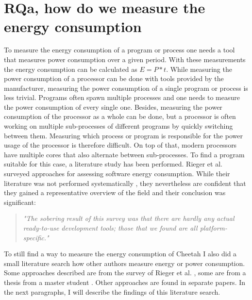 \documentclass[../thesis.tex]{subfiles}
\begin{document}
\section{RQa, how do we measure the energy consumption}
\label{section:rqa}To measure the energy consumption of a program or process one needs a tool that measures power consumption over a given period. With these measurements the energy consumption can be calculated as $E=P*t$. While measuring the power consumption of a processor can be done with tools provided by the manufacturer, measuring the power consumption of a single program or process is less trivial. Programs often spawn multiple processes and one needs to measure the power consumption of every single one.  Besides, measuring the power consumption of the processor as a whole can be done, but a processor is often working on multiple sub-processes of different programs by quickly switching between them. Measuring which process or program is responsible for the power usage of the processor is therefore difficult. On top of that, modern processors have multiple cores that also alternate between sub-processes. To find a program suitable for this case, a literature study has been performed. Rieger et al. \citeyearpar{rieger2017} surveyed approaches for assessing software energy consumption. While their literature was not performed systematically \parencite[p. 24]{rieger2017}, they nevertheless are confident that they gained a representative overview of the field and their conclusion was significant:

\begin{quote}
    \emph{"The sobering result of this survey was that there are hardly any actual ready-to-use development tools; those that we found are all platform-specific."} \parencite[p. 24]{rieger2017}
\end{quote}

To still find a way to measure the energy consumption of Cheetah I also did a small literature search how other authors measure energy or power consumption. Some approaches described are from the survey of Rieger et al. \citeyearpar{rieger2017}, some are from a thesis from a master student \parencite{strempel2021}. Other approaches are found in separate papers. In the next paragraphs, I will describe the findings of this literature search.\paragraph{}
\end{document}
